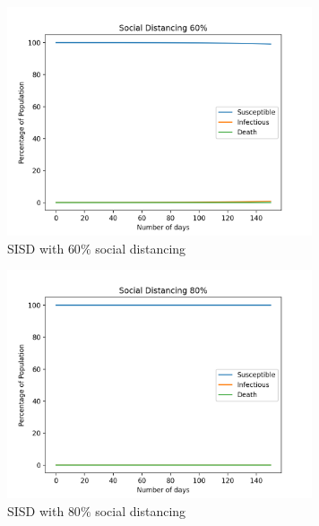 \documentclass{article}
\begin{document}
	\begin{figure}[h!]
		\centering
		\includegraphics[width=90mm]{images/SISD/social_distance_60.png}
		\caption{SISD with $60\%$ social distancing}
	\end{figure}
	\clearpage
	\begin{figure}[h!]
		\centering
		\includegraphics[width=90mm]{images/SISD/social_distance_80.png}
		\caption{SISD with $80\%$ social distancing}
	\end{figure}
\end{document}
